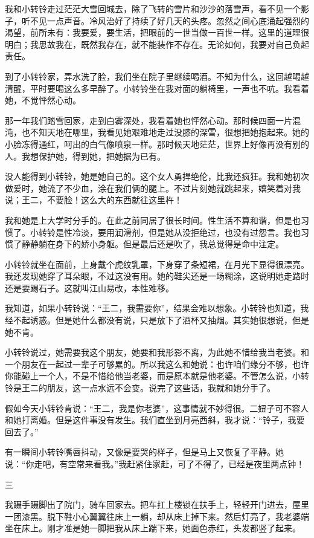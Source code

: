  我和小转铃走过茫茫大雪回城去，除了飞转的雪片和沙沙的落雪声，看不见一个影子，听不见一点声音。冷风治好了持续了好几天的头疼。忽然之间心底涌起强烈的渴望，前所未有：我要爱，要生活，把眼前的一世当做一百世一样。这里的道理很明白；我思故我在，既然我存在，就不能装作不存在。无论如何，我要对自己负起责任。 
 
 到了小转铃家，弄水洗了脸，我们坐在院子里继续喝酒。不知为什么，这回越喝越清醒，平时要喝这么多早醉了。小转铃坐在我对面的躺椅里，一声也不吭。我看着她，不觉怦然心动。 
 
 那一年我们踏雪回家，走到白雾深处，我看着她也怦然心动。那时候四面一片混沌，也不知天地在哪里，我看见她艰难地走过没膝的深雪，很想把她抱起来。她的小脸冻得通红，呵出的白气像喷泉一样。那时候天地茫茫，世界上好像再没有别的人。我想保护她，得到她，把她据为已有。 
 
 没人能得到小转铃，她是她自己的。这个女人勇捍绝伦，比我还疯狂。我和她初次做爱时，她流了不少血，涂在我们俩的腿上。不过片刻她就跳起来，嬉笑着对我说；王二，不要脸！这么大的东西就往这里杵！ 
 
 我和她是上大学时分手的。在此之前同居了很长时间。性生活不算和谐，但是也习惯了。小转铃是性冷淡，要用润滑剂，但是她从没拒绝过，也没有过怨言。我也习惯了静静躺在身下的娇小身躯。但是最后还是吹了，我总觉得是命中注定。 
 
 小转铃就坐在面前，上身戴个虎纹乳罩，下身穿了条短裙，在月光下显得很漂亮。我还发现她穿了耳朵眼，不过这没有用。她的鞋尖还是一场糊涂，这说明她走路时还是要踢石子。这就叫江山易改，本性难移。 
 
 我知道，如果小转铃说：“王二，我需要你”，结果会难以想象。小转铃也知道，我经不起诱惑。但是她什么都没有说，只是放下了酒杯又抽烟。其实她很想说，但是她不肯。 
 
 小转铃说过，她需要我这个朋友，她要和我形影不离，为此她不惜给我当老婆。和一个朋友在一起过一辈子可够累的。所以我这么和她说：也许咱们缘分不够，也许你能碰上一个人，不是不惜给他当老婆，而是原本就是他老婆。不管怎么说，小转铃是王二的朋友，这一点水远不会变。说完了这些话，我就和她分手了。 
 
 假如今天小转铃肯说：“王二，我是你老婆”，这事情就不妙得很。二妞子可不容人和她打离婚。但是这件事没有发生。我们直坐到月亮西斜，我才说：“铃子，我要回去了。” 
 
 有一瞬间小转铃嘴唇抖动，又像是要哭的样子，但是马上又恢复了平静。她说：“你走吧，有空常来看我。”我赶紧住家赶，可了不得了，已经是夜里两点钟！ 
 
 三 
 
 我蹑手蹑脚出了院门，骑车回家去。把车扛上楼锁在扶手上，轻轻开门进去，屋里一团漆黑。脱下鞋小心翼翼往床上一躺，却从床上掉下来。然后灯亮了，我老婆端坐在床上。刚才准是她一脚把我从床上踹下来，她面色赤红，头发都竖了起来。 
 
